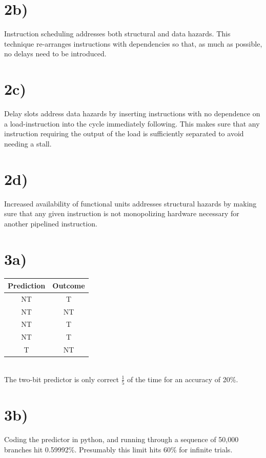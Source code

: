 \documentclass[a4paper,11pt]{article}
\begin{document}
\section*{2b)}
Instruction scheduling addresses both structural and data hazards.  
This technique re-arranges instructions with dependencies so that, as much 
as possible, no delays need to be introduced.


\section*{2c)}
Delay slots address data hazards by inserting instructions with no dependence
on a load-instruction into the cycle immediately following.  This makes sure
that any instruction requiring the output of the load is sufficiently separated
to avoid needing a stall.


\section*{2d)}
Increased availability of functional units addresses structural hazards by 
making sure that any given instruction is not monopolizing hardware necessary
for another pipelined instruction.


\section*{3a)}
\begin{tabular}{| c | c |}
  \hline	
  	Prediction & Outcome \\ \hline \hline
	NT & T \\ \hline
	NT & NT \\ \hline
	NT & T \\ \hline
	NT & T \\ \hline
	T & NT \\ \hline
\end{tabular} \\

The two-bit predictor is only correct $\frac{1}{5}$ of the time for an accuracy of 20\%.

\section*{3b)}
Coding the predictor in python, and running through a sequence of 50,000 
branches hit 0.59992\%.  Presumably this limit hits 60\% for infinite trials.
\end{document}
